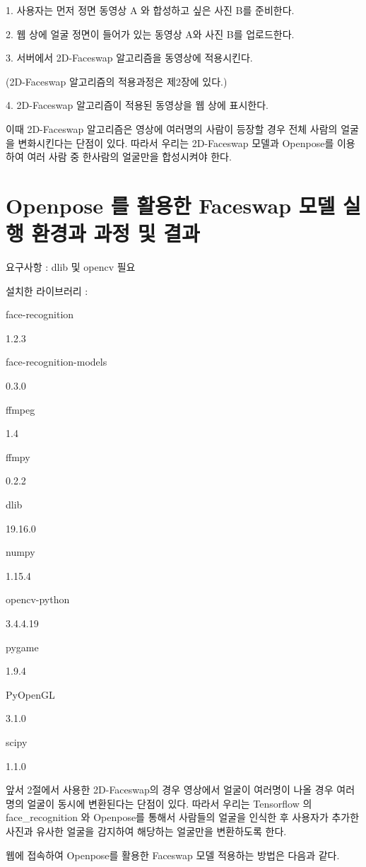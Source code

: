 \documentclass{oblivoir}
\begin{document}
1. 사용자는 먼저 정면 동영상 A 와 합성하고 싶은 사진 B를 준비한다.

2. 웹 상에 얼굴 정면이 들어가 있는 동영상 A와 사진 B를 업로드한다.

3. 서버에서 2D-Faceswap 알고리즘을 동영상에 적용시킨다. 

   (2D-Faceswap 알고리즘의 적용과정은 제2장에 있다.)

4. 2D-Faceswap 알고리즘이 적용된 동영상을 웹 상에 표시한다.

 이때 2D-Faceswap 알고리즘은 영상에 여러명의 사람이 등장할 경우 전체 사람의 얼굴을 변화시킨다는 단점이 있다. 따라서 우리는 2D-Faceswap 모델과 Openpose를 이용하여 여러 사람 중 한사람의 얼굴만을 합성시켜야 한다.

 

 \section{ Openpose 를 활용한 Faceswap 모델 실행 환경과 과정 및 결과}

 요구사항 : dlib 및 opencv 필요

설치한 라이브러리 :

face-recognition

1.2.3

face-recognition-models

0.3.0

ffmpeg

1.4

ffmpy

0.2.2

dlib

19.16.0

numpy

1.15.4

opencv-python

3.4.4.19

pygame

1.9.4

PyOpenGL

3.1.0

scipy

1.1.0

앞서 2절에서 사용한 2D-Faceswap의 경우 영상에서 얼굴이 여러명이 나올 경우 여러명의 얼굴이 동시에 변환된다는 단점이 있다. 따라서 우리는 Tensorflow 의 face_recognition 와 Openpose를 통해서 사람들의 얼굴을 인식한 후 사용자가 추가한 사진과 유사한 얼굴을 감지하여 해당하는 얼굴만을 변환하도록 한다.

웹에 접속하여 Openpose를 활용한 Faceswap 모델 적용하는 방법은 다음과 같다.
\end{document}
